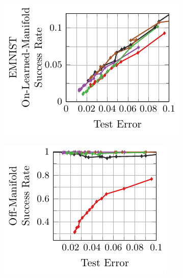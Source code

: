 \begin{appendix}
\begin{figure}[t]
    \begin{subfigure}{0.245\textwidth}
        \centering
        \includegraphics[width=\textwidth]{appendix_mlp_emnist_error_on_learned.pdf}
    \end{subfigure}
    \begin{subfigure}{0.225\textwidth}
        \centering
        \includegraphics[width=0.925\textwidth]{appendix_mlp_emnist_error_off.pdf}
    \end{subfigure}
    \\
    \begin{subfigure}{0.245\textwidth}
        \centering

\end{subfigure}
\end{figure}
\end{appendix}
